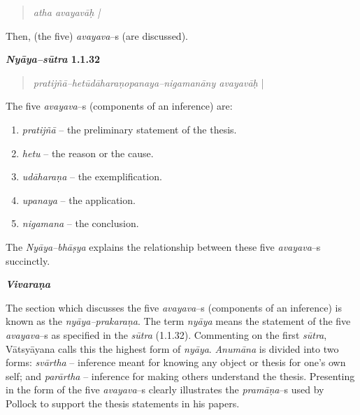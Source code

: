 \begin{verse}
\textit{atha avayavāḥ |}
\end{verse}

Then, (the five) \textit{avayava}–s (are discussed).

\textbf{\textit{Nyāya–sūtra} 1.1.32}

\begin{verse}
\textit{pratijñā–hetūdāharaṇopanaya–nigamanāny avayavāḥ} |
\end{verse}

The five \textit{avayava}–s (components of an inference) are:

\begin{enumerate}
\itemsep=0pt
\item \textit{pratijñā} – the preliminary statement of the thesis.

 \item \textit{hetu} – the reason or the cause.

 \item \textit{udāharaṇa} – the exemplification.

 \item \textit{upanaya} – the application.

 \item \textit{nigamana} – the conclusion.

\end{enumerate}

The \textit{Nyāya–bhāṣya} explains the relationship between these five \textit{avayava}–s succinctly.

\textit{\textbf{Vivaraṇa}}

The section which discusses the five \textit{avayava}–s (components of an inference) is known as the \textit{nyāya–prakaraṇa}. The term \textit{nyāya} means the statement of the five \textit{avayava}–s as specified in the \textit{sūtra} (1.1.32). Commenting on the first \textit{sūtra}, Vātsyāyana calls this the highest form of \textit{nyāya}. \textit{Anumāna} is divided into two forms: \textit{svārtha} – inference meant for knowing any object or thesis for one’s own self; and \textit{parārtha} – inference for making others understand the thesis. Presenting in the form of the five \textit{avayava}–s clearly illustrates the \textit{pramāṇa}–s used by Pollock to support the thesis statements in his papers.

